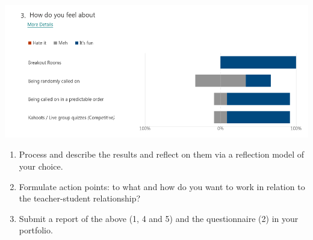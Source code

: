 \documentclass[paper=a4,justified,a4paper]{tufte-handout}
\providecommand{\tightlist}{%
  \setlength{\itemsep}{0pt}\setlength{\parskip}{0pt}}
\begin{document}
\includegraphics{./q3.png}

\begin{enumerate}
\def\labelenumi{\arabic{enumi}.}
\setcounter{enumi}{3}
\tightlist
\item
  Process and describe the results and reflect on them via a reflection
  model of your choice.
\item
  Formulate action points: to what and how do you want to work in
  relation to the teacher-student relationship?
\item
  Submit a report of the above (1, 4 and 5) and the questionnaire (2) in
  your portfolio.
\end{enumerate}


\end{document}

